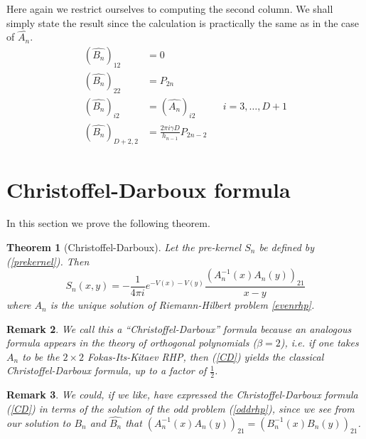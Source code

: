 \documentclass[12pt]{article}
\newtheorem{theorem}{Theorem}[section]
\newtheorem{remark}[theorem]{Remark}
\theoremstyle{definition}
\begin{document}
Here again we restrict ourselves to computing the second column.  We shall simply state the result since the calculation is practically the same as in the case of $\widehat{A_n}$.
\begin{align*}
\left(\widehat{B_n}\right)_{12} &= 0 \\
\left(\widehat{B_n}\right)_{22} &= P_{2n} \\
\left(\widehat{B_n}\right)_{i2} &= \left(\widehat{A_n}\right)_{i2} & & i=3, \dots, D+1 \\
\left(\widehat{B_n}\right)_{D+2,2} &= \frac{2\pi i \gamma D}{h_{n-1}} P_{2n-2}
\end{align*}

\section{Christoffel-Darboux formula}\label{christoffelsection}

In this section we prove the following theorem.
\begin{theorem}[Christoffel-Darboux]
Let the pre-kernel $S_n$ be defined by (\ref{prekernel}). Then
\begin{equation}\label{CD}
\boxed{S_n(x,y) = -\frac{1}{4\pi i} e^{-V(x)-V(y)} \frac{\left( A_n^{-1}(x) A_n(y) \right)_{21}}{x-y}}
\end{equation}
where $A_n$ is the unique solution of Riemann-Hilbert problem \ref{evenrhp}.
\end{theorem}
\begin{remark} We call this a \enquote{Christoffel-Darboux} formula because an analogous formula appears in the theory of orthogonal polynomials ($\beta = 2$), i.e. if one takes $A_n$ to be the $2\times 2$ Fokas-Its-Kitaev \cite{fokas} RHP, then (\ref{CD}) yields the classical Christoffel-Darboux formula, up to a factor of $\frac{1}{2}$.
\end{remark}

\begin{remark} We could, if we like, have expressed the Christoffel-Darboux formula (\ref{CD}) in terms of the solution of the odd problem (\ref{oddrhp}), since we see from our solution to $B_n$ and $\widehat{B_n}$ that $( A_n^{-1}(x) A_n(y) )_{21} = ( B_n^{-1}(x) B_n(y) )_{21}$.
\end{remark}
\end{document}
